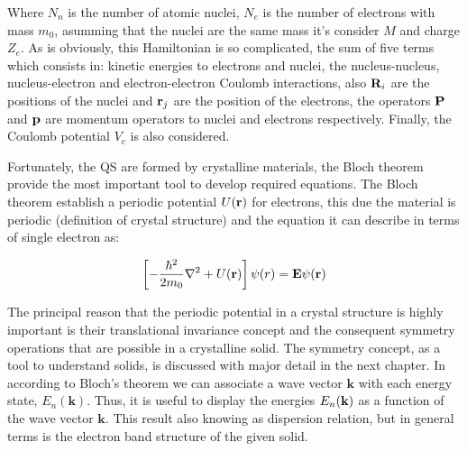 Where  $N_{n}$ is the number of atomic nuclei, $N_{e}$ is the number of electrons with mass $m_{0}$, asumming that the nuclei are the same mass it's consider  $M$ and charge $Z_{e}$. As is obviously, this Hamiltonian is so complicated, the sum of five terms which consists in: kinetic energies to electrons and nuclei, the nucleus-nucleus, nucleus-electron and electron-electron Coulomb interactions, also $\mathrm{\bf R}_{i}$ are the positions of the nuclei and $\mathrm{\bf r}_{j}$ are the position of the electrons, the operators $\mathrm{\bf P}$ and $\mathrm{\bf p}$ are momentum operators to nuclei and electrons respectively.  Finally, the Coulomb potential $V_{c}$\cite{alloul2010introduction} is also considered.  


Fortunately, the QS are formed by crystalline materials, the Bloch theorem provide the most important tool to develop required equations. The Bloch theorem establish a periodic potential $U(\displaystyle\mathrm{\bf r})$ for electrons, this due the material is periodic (definition of crystal structure) and the \sch equation it can describe in terms of single electron  as:  


\begin{equation}
	\left[-\dfrac{\hbar^2}{2m_{0}}\nabla^2 + U(\displaystyle\mathrm{\bf r})\right]\psi (r)=\displaystyle\mathrm{\bf E}\psi(\displaystyle\mathrm{\bf r})
	\label{eq:chapter-1-first-sch}
\end{equation}

The principal reason that the periodic potential in a crystal structure is highly important is their translational invariance concept and the consequent symmetry operations that are possible in a crystalline solid. The symmetry concept, as a  tool to understand solids, is discussed with major detail in the next chapter. In according to Bloch's theorem we can associate a wave vector $\boldsymbol{k}$ with each energy state, $E_{n}(\boldsymbol{k})$. Thus, it is useful to display the energies $E_{n}(\bf{k})$ as a function of the wave vector $\boldsymbol{k}$. This result also knowing as dispersion relation, but in general terms is the electron band structure of the given solid\cite{piprek2017handbook}.   

